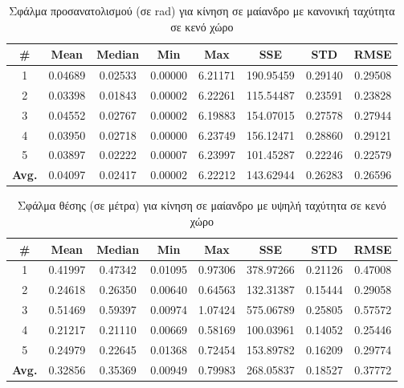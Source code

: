 \begin{table}[H]
    \centering
    \caption{Σφάλμα προσανατολισμού (σε rad) για κίνηση σε μαίανδρο με κανονική ταχύτητα σε κενό χώρο}
    \label{tab:orientation_error_meander_normal_box}
    \begin{tabular}{| c | c | c | c | c | c | c | c | }
        \hline
        \rowcolor{Gray}
        \# & Mean & Median & Min & Max & SSE & STD & RMSE \\
        \hline
        1 & 0.04689 & 0.02533 & 0.00000 & 6.21171 & 190.95459 & 0.29140 & 0.29508 \\
        2 & 0.03398 & 0.01843 & 0.00002 & 6.22261 & 115.54487 & 0.23591 & 0.23828 \\
        3 & 0.04552 & 0.02767 & 0.00002 & 6.19883 & 154.07015 & 0.27578 & 0.27944 \\
        4 & 0.03950 & 0.02718 & 0.00000 & 6.23749 & 156.12471 & 0.28860 & 0.29121 \\
        5 & 0.03897 & 0.02222 & 0.00007 & 6.23997 & 101.45287 & 0.22246 & 0.22579 \\
        \hline
        \textbf{Avg.} & 0.04097 & 0.02417 & 0.00002 & 6.22212 & 143.62944 & 0.26283 & 0.26596 \\
        \hline
    \end{tabular}
\end{table}

\begin{table}[H]
    \begin{center}
        \centering
        \caption{Σφάλμα θέσης (σε μέτρα) για κίνηση σε μαίανδρο με υψηλή ταχύτητα σε κενό χώρο}
        \label{tab:position_error_meander_fast_box}
        \begin{tabular}{| c | c | c | c | c | c | c | c | }
        \hline
        \rowcolor{Gray}
        \# & Mean & Median & Min & Max & SSE & STD & RMSE \\
        \hline
        1 & 0.41997 & 0.47342 & 0.01095 & 0.97306 & 378.97266 & 0.21126 & 0.47008 \\
        2 & 0.24618 & 0.26350 & 0.00640 & 0.64563 & 132.31387 & 0.15444 & 0.29058 \\
        3 & 0.51469 & 0.59397 & 0.00974 & 1.07424 & 575.06789 & 0.25805 & 0.57572 \\
        4 & 0.21217 & 0.21110 & 0.00669 & 0.58169 & 100.03961 & 0.14052 & 0.25446 \\
        5 & 0.24979 & 0.22645 & 0.01368 & 0.72454 & 153.89782 & 0.16209 & 0.29774 \\
        \hline
        \textbf{Avg.} & 0.32856 & 0.35369 & 0.00949 & 0.79983 & 268.05837 & 0.18527 & 0.37772 \\
        \hline
        \end{tabular}
    \end{center}
\end{table}


